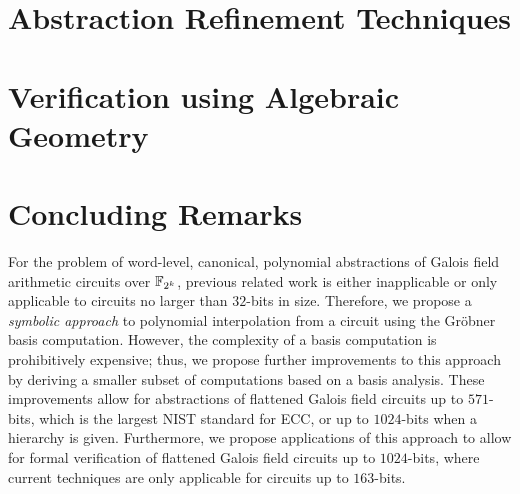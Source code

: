 

\section{Abstraction Refinement Techniques}

\section{Verification using Algebraic Geometry}

\section{Concluding Remarks}
For the problem of word-level, canonical, polynomial abstractions
of Galois field arithmetic circuits over ${\mathbb{F}}_{2^k}$, previous related work 
is either inapplicable or only applicable to circuits no larger than
$32$-bits in size.
Therefore, we propose a {\it symbolic approach} to
polynomial interpolation from a circuit using the Gr\"obner basis
computation. However, the complexity of a \Grobner basis computation is 
prohibitively expensive; thus, we propose further improvements to this 
approach by deriving a smaller subset of computations based on a \Grobner
basis analysis. These improvements allow for abstractions of 
flattened Galois field circuits up to $571$-bits, which is the largest NIST 
standard for ECC, or up to $1024$-bits when a hierarchy is given. 
Furthermore, we propose applications of this 
approach to allow for formal verification of flattened Galois field circuits up to 
$1024$-bits, where current techniques are only applicable for circuits up 
to $163$-bits.